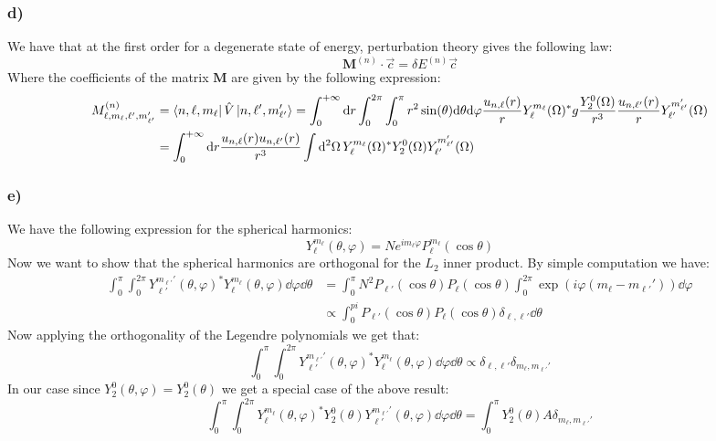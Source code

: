 \documentclass[10pt,a4paper]{book}
\begin{document}
\subsubsection*{d)}
We have that at the first order for a degenerate state of energy, perturbation theory gives the following law:
\[
\mathbf{M}^{(n)} \cdot \vec{c} = \delta E^{(n)} \vec{c}
\]
Where the coefficients of the matrix $\mathbf{M}$ are given by the following expression:
\begin{align*}
M^{(n)}_{\ell, m_\ell, \ell', m_{\ell'}'} &= \bra{n, \ell, m_\ell} \hat{V} \ket{n, \ell', m_{\ell'}'} = \int_0^{+\infty} \dd r \int_0^{2\pi} \int_0^\pi r^2 \sin(\theta) \dd \theta \dd \varphi \frac{u_{n, \ell}(r)}{r} Y_{\ell}^{m_\ell} (\Omega)^* g \frac{Y_{2}^0(\Omega)}{r^3} \frac{u_{n, \ell'}(r)}{r} Y_{\ell'}^{m_{\ell'}'} (\Omega) \\
&= \int_0^{+\infty} \dd r \frac{u_{n, \ell}(r) u_{n, \ell'}(r)}{r^3} \int \dd^2 \Omega \, Y_\ell^{m_\ell} (\Omega)^* Y_2^0 (\Omega) Y_{\ell'}^{m_{\ell'}'} (\Omega)
\end{align*}



\subsubsection*{e)}
We have the following expression for the spherical harmonics:
\[
Y_\ell^{m_\ell} (\theta, \varphi) = N e^{i m_\ell \varphi } P_\ell^{m_\ell} (\cos \theta) 
\]
Now we want to show that the spherical harmonics are orthogonal for the $L_2$ inner product. By simple computation we have:
\begin{align*}
\int_0^\pi \int_0^{2\pi} Y_{\ell'}^{m_{\ell'}'}(\theta,\varphi)^* Y_{\ell}^{m_\ell} (\theta, \varphi) \dd \varphi \dd \theta &= \int_0^{\pi} N^2 P_{\ell'}(\cos \theta) P_\ell (\cos \theta) \int_0^{2\pi} \exp(i \varphi(m_\ell - m_{\ell'}')) \dd \varphi \\
&\propto \int_0^{pi} P_{\ell'}(\cos \theta) P_\ell (\cos\theta) \delta_{\ell, \ell'} \dd \theta 
\end{align*}
Now applying the orthogonality of the Legendre polynomials we get that:
\[
\int_0^\pi \int_0^{2\pi} Y_{\ell'}^{m_{\ell'}'}(\theta,\varphi)^* Y_{\ell}^{m_\ell} (\theta, \varphi) \dd \varphi \dd \theta \propto \delta_{\ell, \ell'} \delta_{m_\ell, m_{\ell'}'}
\]
In our case since $Y_{2}^0(\theta, \varphi) = Y_2^0(\theta)$ we get a special case of the above result:
\[
\int_{0}^\pi \int_0^{2\pi} Y_{\ell}^{m_\ell}(\theta, \varphi)^* Y_2^0 (\theta) Y_{\ell'}^{m_{\ell'}'}(\theta, \varphi) \dd \varphi \dd \theta = \int_0^{\pi} Y_2^0(\theta) A \delta_{m_\ell, m_{\ell'}'}
\]
\end{document}

